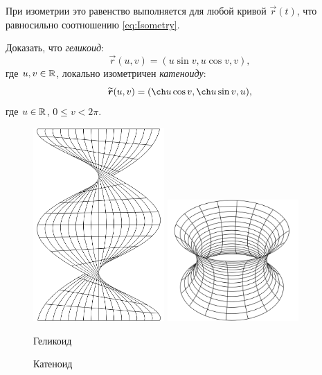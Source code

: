При изометрии это равенство выполняется для любой кривой $\vec{r}(t)$, что равносильно соотношению \eqref{eq:Isometry}.

\begin{problem}
	Доказать, что \textit{геликоид}:
	\[
		\vec{r}(u, v) = (u\sin v, u\cos v, v),
	\]
	где $u, v \in \mathbb{R}$, локально изометричен \textit{катеноиду}:
	\[
		\widetilde{\vec{r}}(u, v) = (\ch u\cos v, \ch u\sin v, u),
	\]
	где $u \in \mathbb{R}$, $0 \leqslant v < 2\pi$.
\end{problem}

\begin{figure}[H]
	\centering
	\begin{minipage}{.4\textwidth}
		\centering
		\includegraphics[width=5cm]{./img/Helicoid.pdf}
	\end{minipage}
	\begin{minipage}{.4\textwidth}
		\centering
		\includegraphics[width=5cm]{./img/Catenoid.pdf}
	\end{minipage}
	\vspace{.3cm}

	\begin{minipage}{.4\textwidth}
		\centering
		Геликоид
	\end{minipage}
	\begin{minipage}{.4\textwidth}
		\centering
		Катеноид
	\end{minipage}
	
	\caption[format=empty]{}
	\label{fig:HelicoidCatenoid}
\end{figure}


